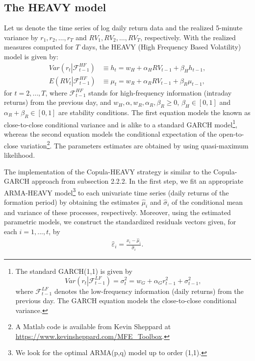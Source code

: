 \documentclass[a4paper,12pt]{report}
\begin{document}
\begin{refsection}
\vspace{0.6cm}

\subsection{The HEAVY model}

Let us denote the time series of log daily return data and the realized 5-minute variance by $r_{1},r_{2},\ldots,r_{T}$ and $RV_{1},RV_{2},\ldots,RV_{T}$, respectively. With the realized measures computed for $T$ days, the HEAVY (High Frequency Based Volatility) model \citep{ss10} is given by:
\begin{align}
Var\left(r_{t}\left\vert\mathcal{F}_{t-1}^{HF}\right. \right)
&\equiv h_{t}=w_{H}+\alpha _{H}RV_{t-1}+\beta _{H}h_{t-1},  \label{CC} \\
E\left(RV_{t}\left\vert\mathcal{F}_{t-1}^{HF}\right. \right)  &\equiv \mu_{t}=w_{R}+\alpha_{R}RV_{t-1}+\beta_{R}\mu_{t-1},  \label{OC}
\end{align}
for $t=2,\ldots,T$, where $\mathcal{F}_{t-1}^{HF}$ stands for high-frequency information (intraday returns) from the previous day, and $w_{H},\alpha,w_{R},\alpha_{R},\beta_{R}\geq 0$, $\beta _{H}\in[0,1]$ and $\alpha_{R}+\beta_{R}\in[0,1]$ are stability conditions. The first equation models the known as close-to-close conditional variance and is alike to a standard GARCH model\footnote{The standard GARCH(1,1) is given by
	\begin{equation}
		Var\left(r_{t}\left\vert \mathcal{F}_{t-1}^{LF}\right. \right) =\sigma
	_{t}^{2}=w_{G}+\alpha_{G}r_{t-1}^{2}+\sigma_{t-1}^{2},
	\label{GCC}
	\end{equation}
	where $\mathcal{F}_{t-1}^{LF}$ denotes the low-frequency information (daily returns) from the previous day. The GARCH equation models the close-to-close conditional variance.}, whereas the second equation models the conditional expectation of the open-to-close variation\footnote{A Matlab code is available from Kevin Sheppard at \url{https://www.kevinsheppard.com/MFE_Toolbox}.}. The parameters estimates are obtained by using quasi-maximum likelihood.

The implementation of the Copula-HEAVY strategy is similar to the Copula-GARCH approach from subsection 2.2.2. In the first step, we fit an appropriate ARMA-HEAVY model\footnote{We look for the optimal ARMA(p,q) model up to order (1,1).} to each univariate time series (daily returns of the formation period) by obtaining the estimates $\widehat{\mu }_{i}$ and $\widehat{\sigma }_{i}$ of the conditional mean and variance of these processes, respectively. Moreover, using the estimated parametric models, we construct the standardized residuals vectors given, for each $i=1,...,t$, by
\begin{equation}
\begin{aligned}
\widehat{\varepsilon }_{i}=\frac{x_{i}-\widehat{\mu }_{i}}{\widehat{\sigma }_{i}}.
\end{aligned}
\label{eq:eq32}
\end{equation}


\end{refsection}
\end{document}
